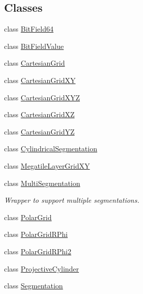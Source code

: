 \subsection*{Classes}
\begin{DoxyCompactItemize}
\item 
class \hyperlink{class_d_d4hep_1_1_d_d_segmentation_1_1_bit_field64}{Bit\+Field64}
\item 
class \hyperlink{class_d_d4hep_1_1_d_d_segmentation_1_1_bit_field_value}{Bit\+Field\+Value}
\item 
class \hyperlink{class_d_d4hep_1_1_d_d_segmentation_1_1_cartesian_grid}{Cartesian\+Grid}
\item 
class \hyperlink{class_d_d4hep_1_1_d_d_segmentation_1_1_cartesian_grid_x_y}{Cartesian\+Grid\+XY}
\item 
class \hyperlink{class_d_d4hep_1_1_d_d_segmentation_1_1_cartesian_grid_x_y_z}{Cartesian\+Grid\+X\+YZ}
\item 
class \hyperlink{class_d_d4hep_1_1_d_d_segmentation_1_1_cartesian_grid_x_z}{Cartesian\+Grid\+XZ}
\item 
class \hyperlink{class_d_d4hep_1_1_d_d_segmentation_1_1_cartesian_grid_y_z}{Cartesian\+Grid\+YZ}
\item 
class \hyperlink{class_d_d4hep_1_1_d_d_segmentation_1_1_cylindrical_segmentation}{Cylindrical\+Segmentation}
\item 
class \hyperlink{class_d_d4hep_1_1_d_d_segmentation_1_1_megatile_layer_grid_x_y}{Megatile\+Layer\+Grid\+XY}
\item 
class \hyperlink{class_d_d4hep_1_1_d_d_segmentation_1_1_multi_segmentation}{Multi\+Segmentation}
\begin{DoxyCompactList}\small\item\em Wrapper to support multiple segmentations. \end{DoxyCompactList}\item 
class \hyperlink{class_d_d4hep_1_1_d_d_segmentation_1_1_polar_grid}{Polar\+Grid}
\item 
class \hyperlink{class_d_d4hep_1_1_d_d_segmentation_1_1_polar_grid_r_phi}{Polar\+Grid\+R\+Phi}
\item 
class \hyperlink{class_d_d4hep_1_1_d_d_segmentation_1_1_polar_grid_r_phi2}{Polar\+Grid\+R\+Phi2}
\item 
class \hyperlink{class_d_d4hep_1_1_d_d_segmentation_1_1_projective_cylinder}{Projective\+Cylinder}
\item 
class \hyperlink{class_d_d4hep_1_1_d_d_segmentation_1_1_segmentation}{Segmentation}

\end{DoxyCompactItemize}
